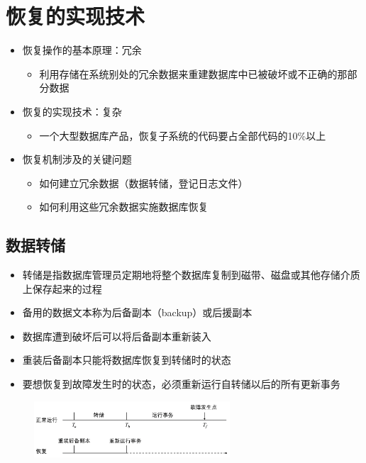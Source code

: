 \section{恢复的实现技术}
\begin{itemize}
    \item 恢复操作的基本原理：冗余
    \begin{itemize}
        \item 利用存储在系统别处的冗余数据来重建数据库中已被破坏或不正确的那部分数据
    \end{itemize}
    \item 恢复的实现技术：复杂
    \begin{itemize}
        \item 一个大型数据库产品，恢复子系统的代码要占全部代码的10\%以上
    \end{itemize}
    \item 恢复机制涉及的关键问题
    \begin{itemize}
        \item 如何建立冗余数据（数据转储，登记日志文件）
        \item 如何利用这些冗余数据实施数据库恢复
    \end{itemize}
\end{itemize}

\subsection{数据转储}
\begin{itemize}
    \item 转储是指数据库管理员定期地将整个数据库复制到磁带、磁盘或其他存储介质上保存起来的过程
    \item 备用的数据文本称为后备副本（backup）或后援副本  
    \item 数据库遭到破坏后可以将后备副本重新装入  
    \item 重装后备副本只能将数据库恢复到转储时的状态 
    \item 要想恢复到故障发生时的状态，必须重新运行自转储以后的所有更新事务
\end{itemize}

\begin{figure}[H]
    \vspace{-0.5em}
	\centering
	\includegraphics[width=0.65\textwidth]{images/10.1}
    \vspace{-1em}
\end{figure}

